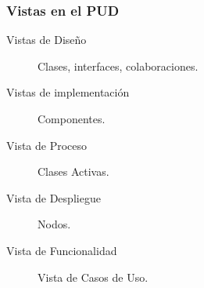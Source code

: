 \subsubsection{Vistas en el PUD}
\begin{description}
	\item[Vistas de Diseño] Clases, interfaces, colaboraciones.
	\item[Vistas de implementación] Componentes.
	\item[Vista de Proceso] Clases Activas.
	\item[Vista de Despliegue] Nodos.
	\item[Vista de Funcionalidad] Vista de Casos de Uso.
\end{description}

